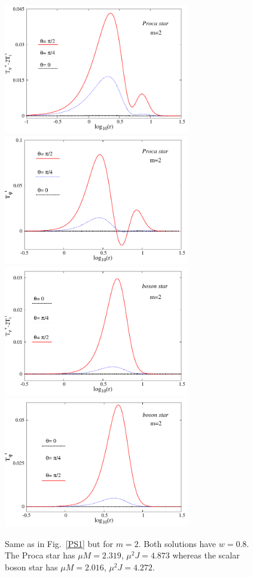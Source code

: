 \begin{figure}[h!]
  \begin{center}
    \includegraphics[width=8.1cm]{papers/Proca/PS-ro-m2.pdf}
       \includegraphics[width=8.1cm]{papers/Proca/PS-T34-m2.pdf}   
        \includegraphics[width=8.1cm]{papers/Proca/BS-ro-m2.pdf}
      \includegraphics[width=8.1cm]{papers/Proca/BS-T34-m2.pdf}
  \end{center}
 \caption{Same as in Fig.~\ref{PS1} but for $m=2$. Both solutions have $w=0.8$. The Proca star has $\mu M=2.319$, 
$\mu^2J=4.873$ whereas the scalar boson star has $\mu M=2.016$, $\mu^2J=4.272$.}
  \label{PS2}
\end{figure}



